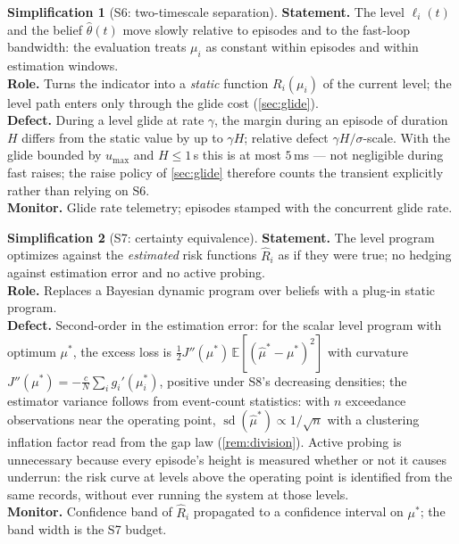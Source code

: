 \documentclass[11pt, a4paper]{article}
\theoremstyle{definition}
\newtheorem{simplification}{Simplification}
\theoremstyle{plain}
\theoremstyle{remark}
\newcommand{\E}{\mathbb{E}}
\begin{document}
\begin{simplification}[S6: two-timescale separation]
\label{simp:twotimescale}
\textbf{Statement.}  The level $\ell_i(t)$ and the belief
$\hat\theta(t)$ move slowly relative to episodes and to the fast-loop
bandwidth: the evaluation treats $\mu_i$ as constant within episodes
and within estimation windows.\\
\textbf{Role.}  Turns the indicator into a \emph{static} function
$R_i(\mu_i)$ of the current level; the level path enters only through
the glide cost (\cref{sec:glide}).\\
\textbf{Defect.}  During a level glide at rate $\gamma$, the margin
during an episode of duration $H$ differs from the static value by up
to $\gamma H$; relative defect $\gamma H / \sigma$-scale.  With the
glide bounded by $u_{\max}$ and $H \le 1$\,s this is at most
$5$\,ms --- not negligible during fast raises; the raise policy of
\cref{sec:glide} therefore counts the transient explicitly rather than
relying on S6.\\
\textbf{Monitor.}  Glide rate telemetry; episodes stamped with the
concurrent glide rate.
\end{simplification}

\begin{simplification}[S7: certainty equivalence]
\label{simp:certainty}
\textbf{Statement.}  The level program optimizes against the
\emph{estimated} risk functions $\hat R_i$ as if they were true; no
hedging against estimation error and no active probing.\\
\textbf{Role.}  Replaces a Bayesian dynamic program over beliefs with a
plug-in static program.\\
\textbf{Defect.}  Second-order in the estimation error: for the scalar
level program with optimum $\mu^*$, the excess loss is
$\tfrac12 J''(\mu^*)\,\E[(\hat\mu^* - \mu^*)^2]$ with curvature
$J''(\mu^*) = -\tfrac{c}{N}\sum_i g_i'(\mu_i^*)$, positive under S8's
decreasing densities; the estimator variance follows from event-count
statistics: with $n$ exceedance observations near the operating point,
$\operatorname{sd}(\hat\mu^*) \propto 1/\sqrt n$ with a clustering
inflation factor read from the gap law (\cref{rem:division}).  Active
probing is unnecessary because every episode's height is measured
whether or not it causes underrun: the risk curve at levels above the
operating point is identified from the same records, without ever
running the system at those levels.\\
\textbf{Monitor.}  Confidence band of $\hat R_i$ propagated to a
confidence interval on $\mu^*$; the band width is the S7 budget.
\end{simplification}
\end{document}
